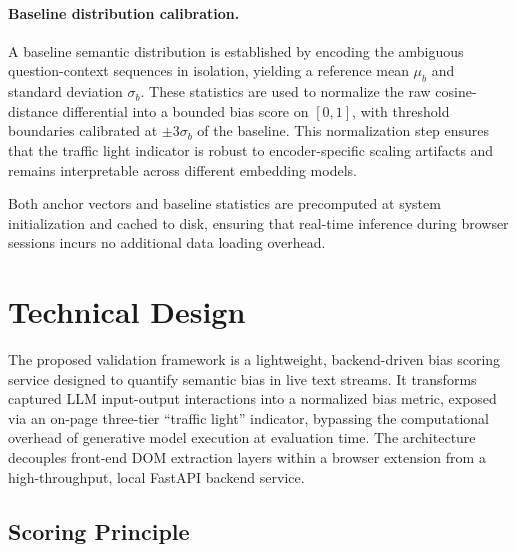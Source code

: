 \documentclass[runningheads]{llncs}
\begin{document}
\paragraph{Baseline distribution calibration.}
A baseline semantic distribution is established by encoding the ambiguous question-context sequences in isolation, yielding a reference mean $\mu_b$ and standard deviation $\sigma_b$. These statistics are used to normalize the raw cosine-distance differential into a bounded bias score on $[0, 1]$, with threshold boundaries calibrated at $\pm 3\sigma_b$ of the baseline. This normalization step ensures that the traffic light indicator is robust to encoder-specific scaling artifacts and remains interpretable across different embedding models.

Both anchor vectors and baseline statistics are precomputed at system initialization and cached to disk, ensuring that real-time inference during browser sessions incurs no additional data loading overhead.



\section{Technical Design}
\label{sec:design}

The proposed validation framework is a lightweight, backend-driven bias scoring service designed to quantify semantic bias in live text streams. It transforms captured LLM input-output interactions into a normalized bias metric, exposed via an on-page three-tier ``traffic light'' indicator, bypassing the computational overhead of generative model execution at evaluation time. The architecture decouples front-end DOM extraction layers within a browser extension from a high-throughput, local FastAPI backend service.

\subsection{Scoring Principle}
\end{document}
